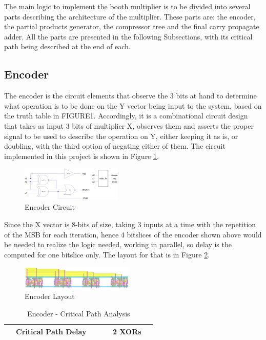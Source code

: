 \documentclass[journal]{IEEEtran}
\begin{document}
The main logic to implement the booth multiplier is to be divided into several parts describing the architecture of the multiplier. These parts are: the encoder, the partial products generator, the compressor tree and the final carry propagate adder. All the parts are presented in the following Subsections, with its critical path being described at the end of each.

\subsection{Encoder}

The encoder is the circuit elements that observe the 3 bits at hand to determine what operation is to be done on the Y vector being input to the system, based on the truth table in FIGURE1. Accordingly, it is a combinational circuit design that takes as input 3 bits of multiplier X, observes them and asserts the proper signal to be used to describe the operation on Y, either keeping it as is, or doubling, with the third option of negating either of them. The circuit implemented in this project is shown in Figure \ref{fig:3}.

\begin{figure}[h!]
  \centering
  \includegraphics[width=0.43\textwidth]{3.png}
  \centering
  \caption{Encoder Circuit}
  \label{fig:3}
\end{figure}


Since the X vector is 8-bits of size, taking 3 inputs at a time with the repetition of the MSB for each iteration, hence 4 bitslices of the encoder shown above would be needed to realize the logic needed, working in parallel, so delay is the computed for one bitslice only. The layout for that is in Figure \ref{fig:4}.

\begin{figure}[h!]
  \centering
  \includegraphics[width=0.48\textwidth]{4.png}
  \centering
  \caption{Encoder Layout}
  \label{fig:4}
\end{figure}



\begin{table}[!h]
\renewcommand{\arraystretch}{1.5}
\caption{Encoder - Critical Path Analysis}
\label{tab:t2}
\centering
\begin{tabular}{|c|c|}
\hline
~~Critical Path Delay ~~ & ~~2 XORs~~\\
\hline
\end{tabular}
\end{table}
\end{document}
